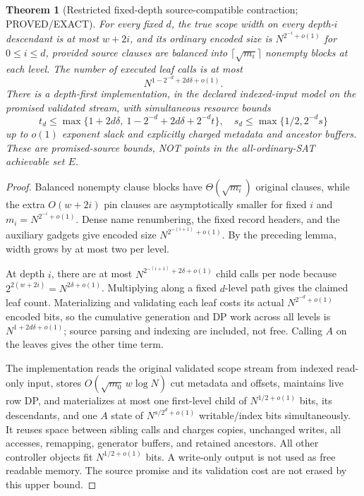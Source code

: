 \documentclass[11pt]{article}
\newtheorem{theorem}{Theorem}
\begin{document}
\begin{theorem}[Restricted fixed-depth source-compatible contraction; PROVED/EXACT]
For every fixed $d$, the true scope width on every depth-$i$ descendant is at most $w+2i$, and its ordinary encoded size is $N^{2^{-i}+o(1)}$ for $0\le i\le d$, provided source clauses are balanced into $\lceil\sqrt{m_i}\rceil$ nonempty blocks at each level. The number of executed leaf calls is at most
\[
N^{1-2^{-d}+2d\delta+o(1)}.
\]
There is a depth-first implementation, in the declared indexed-input model on the promised validated stream, with simultaneous resource bounds
\[
\boxed{
t_d\le\max\{1+2d\delta,\ 1-2^{-d}+2d\delta+2^{-d}t\},\quad
s_d\le\max\{1/2,2^{-d}s\}
}
\]
up to $o(1)$ exponent slack and explicitly charged metadata and ancestor buffers. These are \emph{promised-source} bounds, NOT points in the all-ordinary-SAT achievable set $E$.
\end{theorem}
\begin{proof}
Balanced nonempty clause blocks have $\Theta(\sqrt{m_i})$ original clauses, while the extra $O(w+2i)$ pin clauses are asymptotically smaller for fixed $i$ and $m_i=N^{2^{-i}+o(1)}$. Dense name renumbering, the fixed record headers, and the auxiliary gadgets give encoded size $N^{2^{-(i+1)}+o(1)}$. By the preceding lemma, width grows by at most two per level.

At depth $i$, there are at most $N^{2^{-(i+1)}+2\delta+o(1)}$ child calls per node because $2^{2(w+2i)}=N^{2\delta+o(1)}$. Multiplying along a fixed $d$-level path gives the claimed leaf count. Materializing and validating each leaf costs its actual $N^{2^{-d}+o(1)}$ encoded bits, so the cumulative generation and DP work across all levels is $N^{1+2d\delta+o(1)}$; source parsing and indexing are included, not free. Calling $A$ on the leaves gives the other time term.

The implementation reads the original validated scope stream from indexed read-only input, stores $O(\sqrt{m_0}\,w\log N)$ cut metadata and offsets, maintains live row DP, and materializes at most one first-level child of $N^{1/2+o(1)}$ bits, its descendants, and one $A$ state of $N^{s/2^d+o(1)}$ writable/index bits simultaneously. It reuses space between sibling calls and charges copies, unchanged writes, all accesses, remapping, generator buffers, and retained ancestors. All other controller objects fit $N^{1/2+o(1)}$ bits. A write-only output is not used as free readable memory. The source promise and its validation cost are not erased by this upper bound.
\end{proof}
\end{document}
